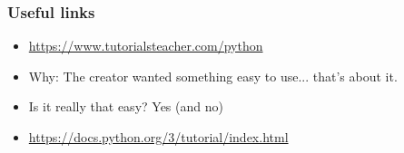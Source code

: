
\begin{frame}
\frametitle{Useful links}

\begin{itemize}
\item \url{https://www.tutorialsteacher.com/python}
\item Why: The creator wanted something easy to use... that's about it.
\item Is it really that easy? Yes (and no)
\item \url{https://docs.python.org/3/tutorial/index.html}
\end{itemize}

\end{frame}
